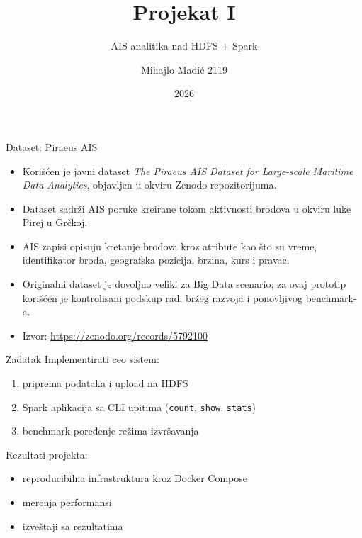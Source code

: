 \documentclass[aspectratio=169,11pt]{beamer}
\title{Projekat I}
\subtitle[AIS analitika nad HDFS + Spark]{AIS analitika nad HDFS + Spark}
\author[Mihajlo Madić 2119]{Mihajlo Madić 2119}
\institute[Big Data Systems]{Big Data Systems}
\date{2026}
\newcommand{\code}[1]{\texttt{\small #1}}
\begin{document}
\begin{frame}
  \titlepage
\end{frame}

\begin{frame}{Dataset: Piraeus AIS}
  \begin{itemize}
    \item Korišćen je javni dataset \textit{The Piraeus AIS Dataset for Large-scale Maritime Data Analytics}, objavljen u okviru Zenodo repozitorijuma.
    \item Dataset sadrži AIS poruke kreirane tokom aktivnosti brodova u okviru luke Pirej u Grčkoj.
    \item AIS zapisi opisuju kretanje brodova kroz atribute kao što su vreme, identifikator broda, geografska pozicija, brzina, kurs i pravac.
    \item Originalni dataset je dovoljno veliki za Big Data scenario; za ovaj prototip korišćen je kontrolisani podskup radi bržeg razvoja i ponovljivog benchmark-a.
    \item Izvor: \url{https://zenodo.org/records/5792100}
  \end{itemize}
\end{frame}

\begin{frame}{Zadatak}
  Implementirati ceo sistem:
  \begin{enumerate}
    \item priprema podataka i upload na HDFS
    \item Spark aplikacija sa CLI upitima (\code{count}, \code{show}, \code{stats})
    \item benchmark poređenje režima izvršavanja
  \end{enumerate}

  \vspace{0.4cm}
  Rezultati projekta:
  \begin{itemize}
    \item reproducibilna infrastruktura kroz Docker Compose
    \item merenja performansi
    \item izveštaji sa rezultatima
  \end{itemize}
\end{frame}
\end{document}
